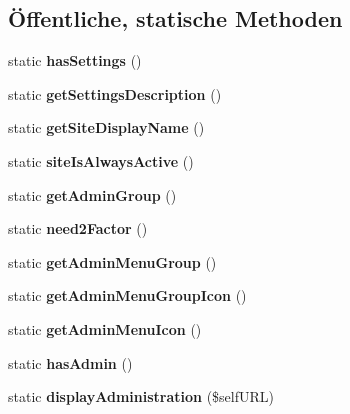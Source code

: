 \subsection*{Öffentliche, statische Methoden}
\begin{DoxyCompactItemize}
\item 
\mbox{\label{class_noten_eingabe_afc89c3444a01bf7f6ccae23fcd80b41b}} 
static {\bfseries has\+Settings} ()
\item 
\mbox{\label{class_noten_eingabe_a5571d8e206890314ea02db276e07c16d}} 
static {\bfseries get\+Settings\+Description} ()
\item 
\mbox{\label{class_noten_eingabe_a884a2fd7f3ba2e4efb998c0ccdd1e164}} 
static {\bfseries get\+Site\+Display\+Name} ()
\item 
\mbox{\label{class_noten_eingabe_af4a2bffa9ce29d559104cd41324663c9}} 
static {\bfseries site\+Is\+Always\+Active} ()
\item 
\mbox{\label{class_noten_eingabe_a09486afa89155bf288947198b1f0443b}} 
static {\bfseries get\+Admin\+Group} ()
\item 
\mbox{\label{class_noten_eingabe_ade6454bf3bcafff419726751f937e7a6}} 
static {\bfseries need2\+Factor} ()
\item 
\mbox{\label{class_noten_eingabe_aa0e5674ffddcf1ed601b5e61e455814d}} 
static {\bfseries get\+Admin\+Menu\+Group} ()
\item 
\mbox{\label{class_noten_eingabe_addb7653d641446bfcecd6dc34ef960c3}} 
static {\bfseries get\+Admin\+Menu\+Group\+Icon} ()
\item 
\mbox{\label{class_noten_eingabe_a9ce884b71e8eeb2fe3c14dda579f8823}} 
static {\bfseries get\+Admin\+Menu\+Icon} ()
\item 
\mbox{\label{class_noten_eingabe_a84b97b88e8edbca583f2979757164cc6}} 
static {\bfseries has\+Admin} ()
\item 
\mbox{\label{class_noten_eingabe_a4c516b2bb4d455594743e09782c3077a}} 
static {\bfseries display\+Administration} (\$self\+U\+RL)
\end{DoxyCompactItemize}
